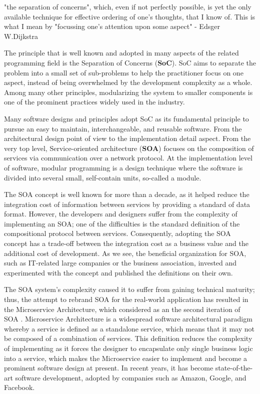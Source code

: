 \begin{displayquote}
    "the separation of concerns", which, even if not perfectly possible, is yet the only available technique for effective ordering of one's thoughts, that I know of. This is what I mean by "focussing one's attention upon some aspect"
    - Edsger W.Dijkstra\cite{dijkstra1974}
\end{displayquote}


The principle that is well known and adopted in many aspects of the related programming field is the Separation of Concerns (\textbf{SoC}). SoC aims to separate the problem into a small set of sub-problems to help the practitioner focus on one aspect, instead of being overwhelmed by the development complexity as a whole. Among many other principles, modularizing the system to smaller components is one of the prominent practices widely used in the industry.

Many software designs and principles adopt SoC as its fundamental principle to pursue an easy to maintain, interchangeable, and reusable software. From the architectural design point of view to the implementation detail aspect. From the very top level, Service-oriented architecture (\textbf{SOA}) focuses on the composition of services via communication over a network protocol. At the implementation level of software, modular programming is a design technique where the software is divided into several small, self-contain units, so-called a module. 

The SOA concept is well known for more than a decade, as it helped reduce the integration cost of information between services by providing a standard of data format. However, the developers and designers suffer from the complexity of implementing an SOA; one of the difficulties is the standard definition of the compositional protocol between services. Consequently, adopting the SOA concept has a trade-off between the integration cost as a business value and the additional cost of development. As we see, the beneficial organization for SOA, such as IT-related large companies or the business association, invested and experimented with the concept and published the definitions on their own\cite{cesar2020, ibmcloudeducation2019}.

The SOA system's complexity caused it to suffer from gaining technical maturity; thus, the attempt to rebrand SOA for the real-world application has resulted in the Microservice Architecture, which considered as an the second iteration of SOA \cite{Dragoni2017}. Microservice Architecture is a widespread software architectural paradigm whereby a service is defined as a standalone service, which means that it may not be composed of a combination of services. This definition reduces the complexity of implementing as it forces the designer to encapsulate only single business logic into a service, which makes the Microservice easier to implement and become a prominent software design at present. In recent years, it has become state-of-the-art software development, adopted by companies such as Amazon, Google, and Facebook.

